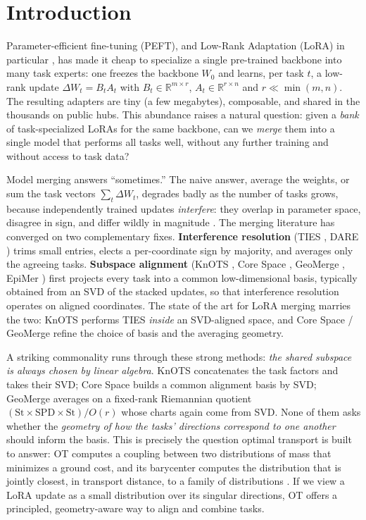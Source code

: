\documentclass[11pt]{article}
\newcommand{\dW}{\Delta W}
\newcommand{\R}{\mathbb{R}}
\begin{document}
\section{Introduction}
\label{sec:intro}

Parameter-efficient fine-tuning (PEFT), and Low-Rank Adaptation (LoRA) in particular
\citep{hu2022lora}, has made it cheap to specialize a single pre-trained backbone into many
task experts: one freezes the backbone $W_0$ and learns, per task $t$, a low-rank update
$\dW_t = B_t A_t$ with $B_t \in \R^{m\times r}$, $A_t \in \R^{r\times n}$ and $r \ll \min(m,n)$.
The resulting adapters are tiny (a few megabytes), composable, and shared in the thousands on public
hubs. This abundance raises a natural question: given a \emph{bank} of task-specialized LoRAs for the
same backbone, can we \emph{merge} them into a single model that performs all tasks well, without any
further training and without access to task data?

Model merging \citep{wortsman2022soups,ilharco2023task,yadav2023ties,li2023deepfusion} answers
``sometimes.'' The naive answer, average the weights, or sum the task vectors
$\sum_t \dW_t$, degrades badly as the number of tasks grows, because independently trained updates
\emph{interfere}: they overlap in parameter space, disagree in sign, and differ wildly in magnitude
\citep{yadav2023ties}. The merging literature has converged on two complementary fixes.
\textbf{Interference resolution} (TIES \citep{yadav2023ties}, DARE \citep{yu2024dare}) trims small
entries, elects a per-coordinate sign by majority, and averages only the agreeing tasks.
\textbf{Subspace alignment} (KnOTS \citep{stoica2024knots}, Core Space \citep{panariello2025corespace},
GeoMerge \citep{dasilva2026geomerge}, EpiMer \citep{lu2026epimer}) first projects every task into a
common low-dimensional basis, typically obtained from an SVD of the stacked updates, so that
interference resolution operates on aligned coordinates. The state of the art for LoRA merging marries
the two: KnOTS performs TIES \emph{inside} an SVD-aligned space, and Core Space / GeoMerge refine the
choice of basis and the averaging geometry.

A striking commonality runs through these strong methods: \emph{the shared subspace is always chosen
by linear algebra}. KnOTS concatenates the task factors and takes their SVD; Core Space builds a
common alignment basis by SVD; GeoMerge averages on a fixed-rank Riemannian quotient
$(\mathrm{St}\times\mathrm{SPD}\times\mathrm{St})/O(r)$ whose charts again come from SVD. None of them
asks whether the \emph{geometry of how the tasks' directions correspond to one another} should inform
the basis. This is precisely the question optimal transport is built to answer: OT computes a coupling
between two distributions of mass that minimizes a ground cost, and its barycenter computes the
distribution that is jointly closest, in transport distance, to a family of distributions
\citep{villani2009ot,peyre2019computational,agueh2011barycenters}. If we view a LoRA update as a small
distribution over its singular directions, OT offers a principled, geometry-aware way to align and
combine tasks.
\end{document}
